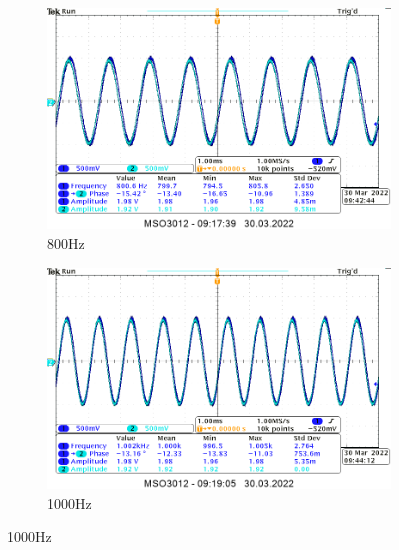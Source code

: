 \begin{itemize}
{    \begin{figure}[H]
        \centering
        \begin{subfigure}[h]{0.4\textwidth}
            \includegraphics[width=\textwidth]{img_osciloscope/CR/CR_800Hz_cropped.png}
            \caption*{800Hz}
        \end{subfigure}
        \begin{subfigure}[h]{0.4\textwidth}
            \includegraphics[width=\textwidth]{img_osciloscope/CR/CR_1000Hz_cropped.png}
            \caption*{1000Hz}
        \end{subfigure}
    \end{figure}
    }
\end{itemize}

\newpage
